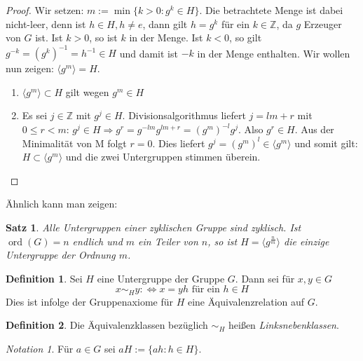\documentclass[12pt]{scrartcl} %
\DeclareMathOperator{\ord}{ord}
\newcommand{\inv}[1]{\left(#1\right)^{-1}}
\newcommand{\Inv}[1]{#1^{-1}}
\newtheorem{thm}{Satz}
\theoremstyle{definition}
\newtheorem*{defn}{Definition}
\theoremstyle{remark}
\newtheorem*{notation}{Notation}
\begin{document}
\begin{proof}
	Wir setzen: $m := \min\lbrace k>0 : g^{k} \in H \rbrace$.
	Die betrachtete Menge ist dabei nicht-leer, denn ist $h \in H, h \neq e$, dann gilt $h = g^{k}$ für ein $k\in\mathbb{Z}$, da $g$ Erzeuger von $G$ ist.
	Ist $k>0$, so ist $k$ in der Menge.
	Ist $k<0$, so gilt $g^{-k}=\inv{{g^k}}=\Inv{h}\in H$ und damit ist $-k$ in der Menge enthalten.
	Wir wollen nun zeigen: $\langle g^{m} \rangle = H$.
	\begin{enumerate}
	\item $\langle g^{m} \rangle \subset H$ gilt wegen $g^{m} \in H$
	\item Es sei $j \in \mathbb{Z}$ mit $g^{j} \in H$. Divisionsalgorithmus liefert $j=lm+r$ mit $0 \leq r < m$: $g^{j} \in H \Rightarrow g^{r}=g^{-lm}g^{lm+r}=(g^{m})^{-l}g^{j}$. Also $g^{r} \in H$. Aus der Minimalität von M folgt $r=0$. Dies liefert $g^{j}=(g^{m})^{l} \in \langle g^{m} \rangle$ und somit gilt: $H \subset \langle g^{m} \rangle$ und die zwei Untergruppen stimmen überein. \qedhere
	\end{enumerate}
\end{proof}

Ähnlich kann man zeigen:

\begin{thm} %
	Alle Untergruppen einer zyklischen Gruppe sind zyklisch.
	Ist $\ord(G)=n$ endlich und $m$ ein Teiler von $n$, so ist $H = \langle g^{\frac{n}{m}}\rangle$ die einzige Untergruppe der Ordnung $m$.
\end{thm}

\begin{defn}
	Sei $H$ eine Untergruppe der Gruppe $G$.
	Dann sei für \(x, y \in G\) \[x \sim_{H} y :\Leftrightarrow \text{\(x = yh\) für ein \(h \in H\)}\]
	Dies ist infolge der Gruppenaxiome für \(H\) eine Äquivalenzrelation auf \(G\).
\end{defn}

\begin{defn}
	Die Äquivalenzklassen bezüglich $\sim_{H}$ heißen \emph{Linksnebenklassen}.
\end{defn}

\begin{notation}
	Für $a \in G$ sei $aH := \{ah : h \in H\}$.
\end{notation}
\end{document}
